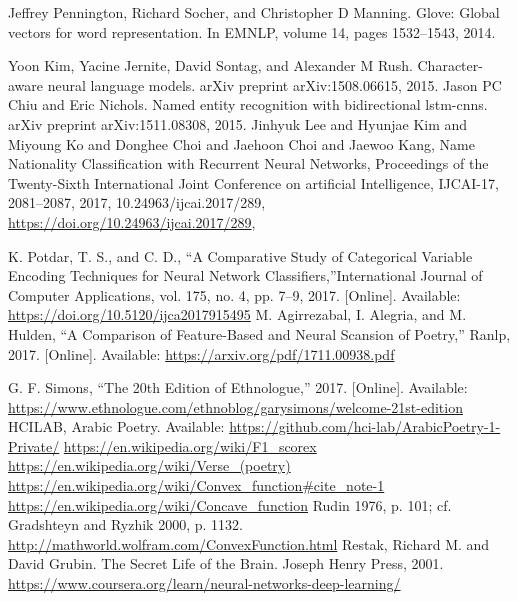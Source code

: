 \begin{thebibliography}{999}
 Jeffrey Pennington, Richard Socher, and Christopher D Manning. Glove: Global vectors for word representation. In EMNLP, volume 14, pages 1532–1543, 2014.

 Yoon Kim, Yacine Jernite, David Sontag, and Alexander M Rush. Character-aware neural language models. arXiv preprint arXiv:1508.06615, 2015.
 Jason PC Chiu and Eric Nichols. Named entity recognition with bidirectional lstm-cnns. arXiv preprint arXiv:1511.08308, 2015.
 Jinhyuk Lee and Hyunjae Kim and Miyoung Ko and Donghee Choi and Jaehoon Choi and Jaewoo Kang, Name Nationality Classification with Recurrent Neural Networks, Proceedings of the Twenty-Sixth International Joint Conference on artificial Intelligence, {IJCAI-17}, 2081--2087, 2017, 10.24963/ijcai.2017/289, \url{https://doi.org/10.24963/ijcai.2017/289},

K. Potdar, T. S., and C. D., “A Comparative Study of Categorical Variable Encoding Techniques for Neural Network Classifiers,”International Journal of Computer Applications, vol. 175, no. 4, pp. 7–9, 2017. [Online]. Available: \url{https://doi.org/10.5120/ijca2017915495}
 M. Agirrezabal, I. Alegria, and M. Hulden, “A Comparison of Feature-Based and Neural Scansion of Poetry,” Ranlp, 2017. [Online]. Available: \url{https://arxiv.org/pdf/1711.00938.pdf}

 G. F. Simons, “The 20th Edition of Ethnologue,” 2017. [Online]. Available: \url{https://www.ethnologue.com/ethnoblog/garysimons/welcome-21st-edition}
 HCILAB, Arabic Poetry. Available: \url{https://github.com/hci-lab/ArabicPoetry-1-Private/}
 \url{https://en.wikipedia.org/wiki/F1\_scorex}
 \url{https://en.wikipedia.org/wiki/Verse\_(poetry)}
 \url{https://en.wikipedia.org/wiki/Convex\_function\#cite\_note-1}
 \url{https://en.wikipedia.org/wiki/Concave\_function}
 Rudin 1976, p. 101; cf. Gradshteyn and Ryzhik 2000, p. 1132.
 \url{http://mathworld.wolfram.com/ConvexFunction.html}
 Restak, Richard M. and David Grubin. The Secret Life of the Brain. Joseph Henry Press, 2001.
 \url{https://www.coursera.org/learn/neural-networks-deep-learning/}
\end{thebibliography}


